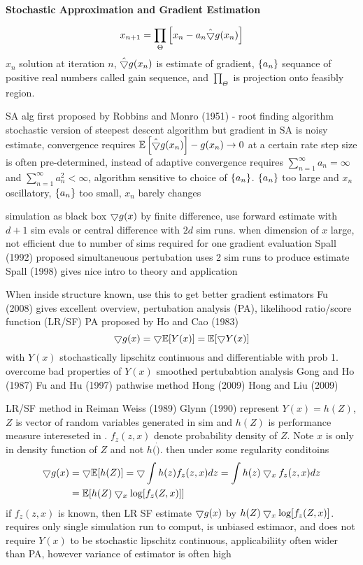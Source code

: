 \textbf{Stochastic Approximation and Gradient Estimation}

\begin{equation}
x_{n+1} = \prod_\Theta \left[ x_n - a_n \hat{\bigtriangledown} g(x_n) \right]
\end{equation}
$x_n$ solution at iteration $n$, $\hat{\bigtriangledown} g(x_n)$ is estimate of gradient, $\left\{ a_n \right\}$ sequance of positive real numbers called gain sequence, and $\prod_\Theta$ is projection onto feasibly region.

SA alg first proposed by Robbins and Monro (1951) - root finding algorithm
stochastic version of steepest descent algorithm
but gradient in SA is noisy estimate, convergence requires $\mathbb{E} \left[ \hat {\bigtriangledown} g(x_n) \right] - g(x_n) \rightarrow 0$ at a certain rate
step size is often pre-determined, instead of adaptive
convergence requires $\sum_{n=1}^\infty a_n = \infty$ and $\sum_{n=1}^\infty a_n^2 < \infty$, algorithm sensitive to choice of $\left\{ a_n \right\}$.  $\left\{ a_n \right\} $ too large and $x_n$ oscillatory, $\left\{ a_n \right\} $ too small, $x_n$ barely changes

simulation as black box $\bigtriangledown g(x)$ by finite difference, use forward estimate with $d+1$ sim evals or central difference with $2d$ sim runs.
when dimension of $x$ large, not efficient due to number of sims required for one gradient evaluation
Spall (1992) proposed simultaneuous pertubation uses 2 sim runs to produce estimate
Spall (1998) gives nice intro to theory and application

When inside structure known, use this to get better gradient estimators
Fu (2008) gives excellent overview, pertubation analysis (PA), likelihood ratio/score function (LR/SF)
PA proposed by Ho and Cao (1983)
\begin{equation}
\bigtriangledown g(x) = \bigtriangledown \mathbb{E} [ Y(x) ] = \mathbb{E} [ \bigtriangledown Y (x) ] 
\end{equation}
with $Y(x)$ stochastically lipschitz continuous and differentiable with prob 1.
overcome bad properties of $Y(x)$
smoothed pertubabtion analysis Gong and Ho (1987) Fu and Hu (1997)
pathwise method Hong (2009) Hong and Liu (2009)

LR/SF method in Reiman Weiss (1989) Glynn (1990)
represent $Y(x) = h(Z)$, $Z$ is vector of random variables generated in sim and $h(Z)$ is performance measure intereseted in .  $f_z(z,x)$ denote probability density of $Z$.  Note $x$ is only in density function of $Z$ and not $h(\dot)$.
then under some regularity conditoins
\begin{align}
\bigtriangledown g(x) &= \bigtriangledown \mathbb{E} [ h(Z) ] = \bigtriangledown \int h(z) f_z(z,x) dz = \int h(z) \bigtriangledown_x f_z(z,x) dz \\
	&= \mathbb{E} [ h(Z) \bigtriangledown_x \log [ f_z(Z,x) ] ]
\end{align}
if $f_z(z,x)$ is known, then LR SF estimate $\bigtriangledown g(x)$ by $h(Z) \bigtriangledown_x \log [ f_z(Z,x) ]$. requires only single simulation run to comput, is unbiased estimaor, and does not require $Y(x)$ to be stochastic lipschitz continuous, applicabiliity often wider than PA, however variance of estimator is often high
